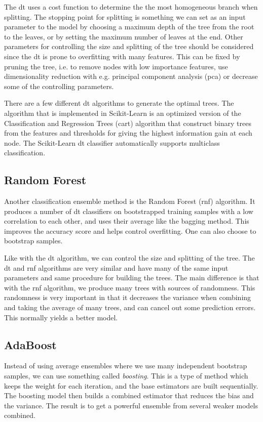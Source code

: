 \documentclass[a4paper, american, 12pt]{report}
\begin{document}
	The \acrshort{dt} uses a cost function to determine the the most homogeneous branch when splitting. The stopping point for splitting is something we can set as an input parameter to the model by choosing a maximum depth of the tree from the root to the leaves, or by setting the maximum number of leaves at the end. Other parameters for controlling the size and splitting of the tree should be considered since the \acrshort{dt} is prone to overfitting with many features. This can be fixed by pruning the tree, i.e. to remove nodes with low importance features, use dimensionality reduction with e.g. principal component analysis (\acrshort{pca})\cite{PCA} or decrease some of the controlling parameters.
	
	There are a few different \acrshort{dt} algorithms to generate the optimal trees. The algorithm that is implemented in Scikit-Learn is an optimized version of the Classification and Regression Trees (\acrshort{cart}) algorithm that construct binary trees from the features and thresholds for giving the highest information gain at each node. The Scikit-Learn \acrshort{dt} classifier automatically supports multiclass classification.
	
	
	\subsection{Random Forest}
	\label{subsect:Theory-RandomForest}
	Another classification ensemble method is the Random Forest (\acrshort{rnf})\cite{randomforest} algorithm. It produces a number of \acrshort{dt} classifiers on bootstrapped training samples with a low correlation to each other, and uses their average like the bagging method. This improves the accuracy score and helps control overfitting. One can also choose to bootstrap samples. 
	
	Like with the \acrshort{dt} algorithm, we can control the size and splitting of the tree. The \acrshort{dt} and \acrshort{rnf} algorithms are very similar and have many of the same input parameters and same procedure for building the trees. The main difference is that with the \acrshort{rnf} algorithm, we produce many trees with sources of randomness. This randomness is very important in that it decreases the variance when combining and taking the average of many trees, and can cancel out some prediction errors. This normally yields a better model.
	
	
	\subsection{AdaBoost}
	\label{subsect:Theory-AdaBoost}
	Instead of using average ensembles where we use many independent bootstrap samples, we can use something called \textit{boosting}. This is a type of method which keeps the weight for each iteration, and the base estimators are built sequentially. The boosting model then builds a combined estimator that reduces the bias and the variance. The result is to get a powerful ensemble from several weaker models combined.
	
\end{document}
